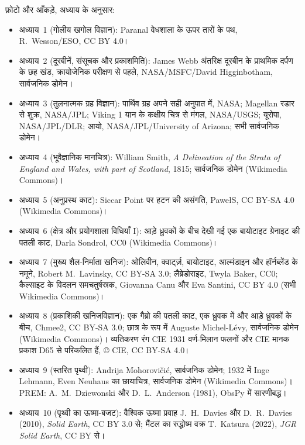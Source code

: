 \bigskip
\noindent फ़ोटो और आँकड़े, अध्याय के अनुसार:
\begin{itemize}\small\setlength{\emergencystretch}{2em}
  \item अध्याय~1 (गोलीय खगोल विज्ञान): Paranal वेधशाला के ऊपर तारों के पथ, R.~Wesson/ESO, CC BY 4.0।
  \item अध्याय~2 (दूरबीनें, संसूचक और प्रकाशमिति): James Webb अंतरिक्ष दूरबीन के प्राथमिक दर्पण के छह खंड, क्रायोजेनिक परीक्षण से पहले, NASA/MSFC/David Higginbotham, सार्वजनिक डोमेन।
  \item अध्याय~3 (तुलनात्मक ग्रह विज्ञान): पार्थिव ग्रह अपने सही अनुपात में, NASA; Magellan रडार से शुक्र, NASA/\allowbreak{}JPL; Viking 1 यान के कक्षीय चित्र से मंगल, NASA/\allowbreak{}USGS; यूरोपा, NASA/\allowbreak{}JPL/\allowbreak{}DLR; आयो, NASA/\allowbreak{}JPL/\allowbreak{}University of Arizona; सभी सार्वजनिक डोमेन।
  \item अध्याय~4 (भूवैज्ञानिक मानचित्र): William Smith, \emph{A Delineation of the Strata of England and Wales, with part of Scotland}, 1815; सार्वजनिक डोमेन (Wikimedia Commons)।
  \item अध्याय~5 (अनुप्रस्थ काट): Siccar Point पर हटन की असंगति, PawełS, CC BY-SA 4.0 (Wikimedia Commons)।
  \item अध्याय~6 (क्षेत्र और प्रयोगशाला विधियाँ I): आड़े ध्रुवकों के बीच देखी गई एक बायोटाइट ग्रेनाइट की पतली काट, Darla Sondrol, CC0 (Wikimedia Commons)।
  \item अध्याय~7 (मुख्य शैल-निर्माता खनिज): ओलिवीन, क्वार्ट्ज़, बायोटाइट, आल्मंडाइन और हॉर्नब्लेंड के नमूने, Robert M.~Lavinsky, CC BY-SA 3.0; लैब्रेडोराइट, Twyla Baker, CC0; कैल्साइट के विदलन समचतुर्षस्रक, Giovanna Canu और Eva Santini, CC BY 4.0 (सभी Wikimedia Commons)।
  \item अध्याय~8 (प्रकाशिकी खनिजविज्ञान): एक गैब्रो की पतली काट, एक ध्रुवक में और आड़े ध्रुवकों के बीच, Chmee2, CC BY-SA 3.0; छात्र के रूप में Auguste Michel-Lévy, सार्वजनिक डोमेन (Wikimedia Commons)। व्यतिकरण रंग CIE 1931 वर्ण-मिलान फलनों और CIE मानक प्रकाश D65 से परिकलित हैं, \copyright{} CIE, CC BY-SA 4.0।
  \item अध्याय~9 (स्तरित पृथ्वी): Andrija Mohorovičić, सार्वजनिक डोमेन; 1932 में Inge Lehmann, Even Neuhaus का छायाचित्र, सार्वजनिक डोमेन (Wikimedia Commons)। PREM: A.~M.~Dziewonski और D.~L.~Anderson (1981), ObsPy में सारणीबद्ध।
  \item अध्याय~10 (पृथ्वी का ऊष्मा-बजट): वैश्विक ऊष्मा प्रवाह J.~H.~Davies और D.~R.~Davies (2010), \emph{Solid Earth}, CC BY 3.0 से; मैंटल का रुद्धोष्म वक्र T.~Katsura (2022), \emph{JGR Solid Earth}, CC BY से।

\end{itemize}
